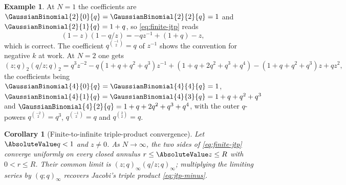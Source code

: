 \documentclass[11pt,a4paper,oneside,openany]{book}
\newtheorem{corollary}[corollary]{Corollary}
\theoremstyle{definition}
\newtheorem{example}[example]{Example}
\theoremstyle{remark}
\begin{document}
\begin{example}\label{ex:finite-jtp-N1}
At $N=1$ the coefficients are $\GaussianBinomial{2}{0}{q}=\GaussianBinomial{2}{2}{q}=1$ and $\GaussianBinomial{2}{1}{q}=1+q$, so \eqref{eq:finite-jtp} reads
\[
 (1-z)(1-q/z)=-q z^{-1}+(1+q)-z,
\]
which is correct.  The coefficient $q^{\binom{-1}{2}}=q$ of $z^{-1}$ shows the convention for negative $k$ at work.  At $N=2$ one gets
\[
 (z;q)_2(q/z;q)_2
 =q^{3}z^{-2}-q(1+q+q^{2}+q^{3})z^{-1}
 +(1+q+2q^{2}+q^{3}+q^{4})
 -(1+q+q^{2}+q^{3})z+qz^{2},
\]
the coefficients being $\GaussianBinomial{4}{0}{q}=\GaussianBinomial{4}{4}{q}=1$,
$\GaussianBinomial{4}{1}{q}=\GaussianBinomial{4}{3}{q}=1+q+q^2+q^3$ and
$\GaussianBinomial{4}{2}{q}=1+q+2q^2+q^3+q^4$, with the outer $q$-powers
$q^{\binom{-2}{2}}=q^{3}$, $q^{\binom{-1}{2}}=q$ and $q^{\binom22}=q$.
\end{example}

\begin{corollary}[Finite-to-infinite triple-product convergence]\label{cor:jtp-from-finite}
Let $\AbsoluteValue q<1$ and $z\ne0$.  As $N\to\infty$, the two sides of
\eqref{eq:finite-jtp} converge uniformly on every closed annulus
$r\le\AbsoluteValue z\le R$ with $0<r\le R$.  Their common limit is
$(z;q)_\infty(q/z;q)_\infty$; multiplying the limiting series by
$(q;q)_\infty$ recovers Jacobi's triple product \eqref{eq:jtp-minus}.
\end{corollary}
\end{document}
